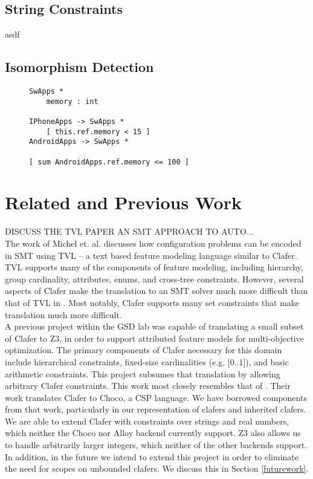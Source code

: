 \documentclass{easychair}
\begin{document}
\subsection{String Constraints}
asdf

\subsection{Isomorphism Detection}
\label{isomorphism}
\begin{figure}[!t]
\centering
\begin{lstlisting}[language=clafer, caption=A more complex mobile phone specification in clafer., label={listing:ClaferMoreComplexSpec}, xleftmargin=.2\textwidth, xrightmargin=.2\textwidth]
SwApps *
	memory : int

IPhoneApps -> SwApps *	
	[ this.ref.memory < 15 ]
AndroidApps -> SwApps *

[ sum AndroidApps.ref.memory <= 100 ]	
\end{lstlisting}%
\end{figure}


\section{Related and Previous Work}
DISCUSS THE TVL PAPER AN SMT APPROACH TO AUTO... \\
\indent The work of Michel et. al. \cite{Michel2012} discusses how configuration problems can be encoded in SMT using TVL \cite{Classen2011} -- a text based feature modeling language similar to Clafer. TVL supports many of the components of feature modeling, including hierarchy, group cardinality, attributes, enums, and cross-tree constraints. However, several aspects of Clafer make the translation to an SMT solver much more difficult than that of TVL in \cite{Michel2012}. Most notably, Clafer supports many set constraints that make translation much more difficult. \\
\indent  A previous project \cite{Olaechea2013} within the GSD lab was capable of translating a small subset of Clafer to Z3, in order to support attributed feature models for multi-objective optimization. The primary components of Clafer necessary for this domain include hierarchical constraints, fixed-size cardinalities (e.g. [0..1]), and basic arithmetic constraints. This project subsumes that translation by allowing arbitrary Clafer constraints.
\indent This work most closely resembles that of \cite{jimmy}. Their work translates Clafer to Choco, a CSP language. We have borrowed components from that work, particularly in our representation of clafers and inherited clafers. We are able to extend Clafer with constraints over strings and real numbers, which neither the Choco nor Alloy backend currently support. Z3 also allows us to handle arbitrarily larger integers, which neither of the other backends support. In addition, in the future we intend to extend this project in order to eliminate the need for scopes on unbounded clafers. We discuss this in Section \ref{futurework}. \\
\end{document}
